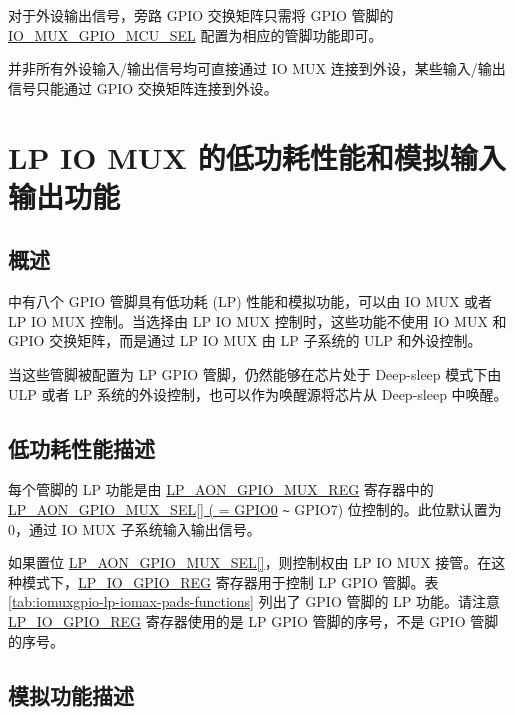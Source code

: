 \documentclass[main\_\_CN.tex]{subfiles}
\begin{document}
对于外设输出信号，旁路 GPIO 交换矩阵只需将 GPIO 管脚的 \hyperref[fielddesc:IOMUXGPIONMCUSEL]{IO\_MUX\_GPIO\_MCU\_SEL} 配置为相应的管脚功能即可。

\begin{tiplisting}
并非所有外设输入/输出信号均可直接通过 IO MUX 连接到外设，某些输入/输出信号只能通过 GPIO 交换矩阵连接到外设。
\end{tiplisting}

\section{LP IO MUX 的低功耗性能和模拟输入输出功能}

\subsection{概述}

\chipname{} 中有八个 GPIO 管脚具有低功耗 (LP) 性能和模拟功能，可以由 IO MUX 或者 LP IO MUX 控制。当选择由 LP IO MUX 控制时，这些功能不使用 IO MUX 和 GPIO 交换矩阵，而是通过 LP IO MUX 由 LP 子系统的 ULP 和外设控制。

当这些管脚被配置为 LP GPIO 管脚，仍然能够在芯片处于 Deep-sleep 模式下由 ULP 或者 LP 系统的外设控制，也可以作为唤醒源将芯片从 Deep-sleep 中唤醒。

\subsection{低功耗性能描述}

每个管脚的 LP 功能是由 \hyperref[regdesc:LPAONGPIOMUXREG]{LP\_AON\_GPIO\_MUX\_REG} 寄存器中的 \hyperref[fielddesc:LPAONGPIOMUXSEL]{LP\_AON\_GPIO\_MUX\_SEL[] ( = GPIO0} \verb+~+ GPIO7) 位控制的。此位默认置为 0，通过 IO MUX 子系统输入输出信号。

如果置位 \hyperref[fielddesc:LPAONGPIOMUXSEL]{LP\_AON\_GPIO\_MUX\_SEL[]}，则控制权由 LP IO MUX 接管。在这种模式下，\hyperref[regdesc:LPIOGPIONREG]{LP\_IO\_GPIO\_REG} 寄存器用于控制 LP GPIO 管脚。表 \ref{tab:iomuxgpio-lp-iomax-pads-functions} 列出了 GPIO 管脚的 LP 功能。请注意 \hyperref[regdesc:LPIOGPIONREG]{LP\_IO\_GPIO\_REG} 寄存器使用的是 LP GPIO 管脚的序号，不是 GPIO 管脚的序号。

\subsection{模拟功能描述}
\end{document}
